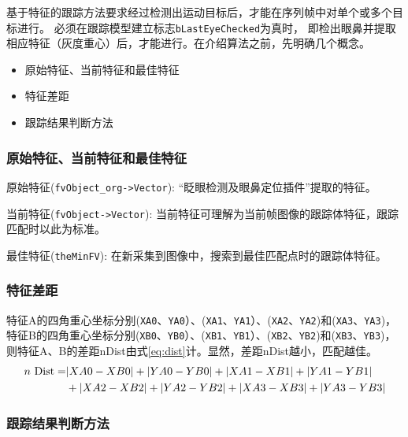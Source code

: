 \documentclass[12pt,hyperref,a4paper,UTF8]{ctexart}
\begin{document}
        基于特征的跟踪方法要求经过检测出运动目标后，才能在序列帧中对单个或多个目标进行。
        必须在跟踪模型建立标志\texttt{bLastEyeChecked}为真时，
        即检出眼鼻并提取相应特征（灰度重心）后，才能进行。在介绍算法之前，先明确几个概念。

        \begin{itemize}
            \item 原始特征、当前特征和最佳特征
            \item 特征差距
            \item 跟踪结果判断方法
        \end{itemize}

        \subsubsection*{\large \textbf{原始特征、当前特征和最佳特征}}

原始特征(\texttt{fvObject\_org->Vector}): “眨眼检测及眼鼻定位插件”提取的特征。

当前特征(\texttt{fvObject->Vector}): 当前特征可理解为当前帧图像的跟踪体特征，跟踪匹配时以此为标准。

最佳特征(\texttt{theMinFV}): 在新采集到图像中，搜索到最佳匹配点时的跟踪体特征。

        \subsubsection*{\large \textbf{特征差距}}

        特征A的四角重心坐标分别(\texttt{XA0}、\texttt{YA0}）、(\texttt{XA1}、\texttt{YA1}）、(\texttt{XA2}、\texttt{YA2})和(\texttt{XA3}、\texttt{YA3})，特征B的四角重心坐标分别(\texttt{XB0}、\texttt{YB0}）、(\texttt{XB1}、\texttt{YB1}）、(\texttt{XB2}、\texttt{YB2})和(\texttt{XB3}、\texttt{YB3})，则特征A、B的差距nDist由式\eqref{eq:dist}计。显然，差距nDist越小，匹配越佳。
        \begin{align}\label{eq:dist}
            n\text{ Dist} = & |X A 0 - X B 0| + |Y A 0 - Y B 0| + |X A 1 - X B 1| + |Y A 1 - Y B 1| \notag \\
                            & + |X A 2 - X B 2| + |Y A 2 - Y B 2|  + |X A 3 - X B 3| + |Y A 3 - Y B 3|
        \end{align}

        \subsubsection*{\large \textbf{跟踪结果判断方法}}
\end{document}
